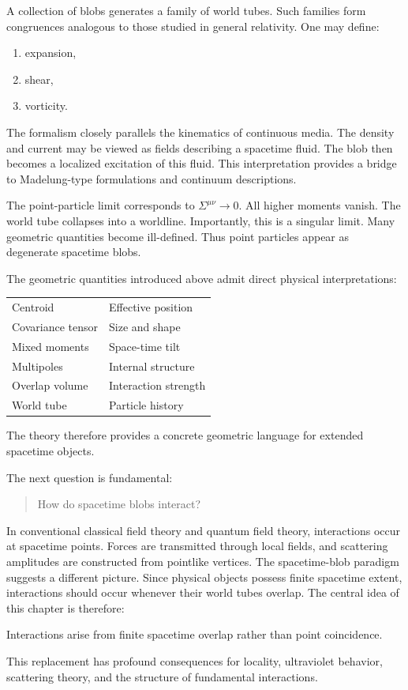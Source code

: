 A collection of blobs generates a family of world tubes.
Such families form congruences analogous to those studied in general
relativity.
One may define:
\begin{enumerate}
\item expansion,
\item shear,
\item vorticity.
\end{enumerate}
The formalism closely parallels the kinematics of continuous media.
The density and current
may be viewed as fields describing a spacetime fluid.
The blob then becomes a localized excitation of this fluid.
This interpretation provides a bridge to Madelung-type formulations and
continuum descriptions.

The point-particle limit corresponds to
$\Sigma^{\mu\nu} \rightarrow 0.$
All higher moments vanish.
The world tube collapses into a worldline.
Importantly, this is a singular limit.
Many geometric quantities become ill-defined.
Thus point particles appear as degenerate spacetime blobs.

The geometric quantities introduced above admit direct physical interpretations:
\begin{center}
\begin{tabular}{ll}
Centroid & Effective position \\
Covariance tensor & Size and shape \\
Mixed moments & Space-time tilt \\
Multipoles & Internal structure \\
Overlap volume & Interaction strength \\
World tube & Particle history
\end{tabular}
\end{center}
The theory therefore provides a concrete geometric language for extended
spacetime objects.

The next question is fundamental:
\begin{quote}
How do spacetime blobs interact?
\end{quote}
In conventional classical field theory and quantum field theory, 
interactions occur at spacetime points. Forces are transmitted 
through local fields, and scattering amplitudes are constructed 
from pointlike vertices.
The spacetime-blob paradigm suggests a different picture.
Since physical objects possess finite spacetime extent, interactions 
should occur whenever their world tubes overlap.
The central idea of this chapter is therefore:
\begin{center}
Interactions arise from finite spacetime overlap rather than point coincidence.
\end{center}
This replacement has profound consequences for locality, ultraviolet
behavior, scattering theory, and the structure of fundamental interactions.

